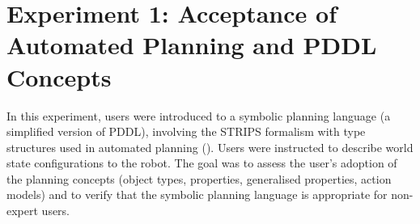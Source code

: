 
\section{Experiment 1: Acceptance of Automated Planning and PDDL Concepts}\label{sec:Exp1}

In this experiment, users were introduced to a symbolic planning language (a simplified version of PDDL), involving the STRIPS formalism with type structures used in automated planning ().
Users were instructed to describe world state configurations to the robot.
The goal was to assess the user's adoption of the planning concepts (object types, properties, generalised properties, action models) and to verify that the symbolic planning language is appropriate for non-expert users.

